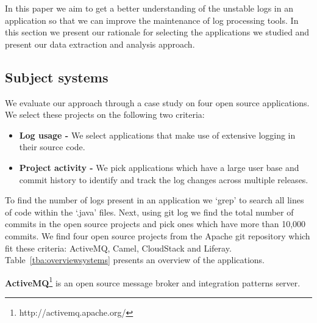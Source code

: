 

In this paper we aim to get a better understanding of the unstable logs in an application so that we can improve the maintenance of log processing tools. In this section we present our rationale for selecting the applications we studied and present our data extraction and analysis approach.

\subsection{Subject systems}
We evaluate our approach through a case study on four open source applications. We select these projects on the following two criteria:
\begin{itemize}
	\item \textbf{Log usage -} We select applications that make use of extensive logging in their source code. 
	\item \textbf{Project activity -} We pick applications which have a large user base and commit history to identify and track the log changes across multiple releases. 
\end{itemize}

To find the number of logs present in an application we `grep' to search all lines of code within the `.java' files. Next, using git log we find the total number of commits in the open source projects and pick ones which have more than 10,000 commits. We find four open source projects from the Apache git repository which fit these criteria: ActiveMQ, Camel, CloudStack  and Liferay. Table~\ref{tba:overviewsystems} presents an overview of the applications.



\textbf{ActiveMQ}\footnote[1]{http://activemq.apache.org/} is an open source message broker and integration patterns server.

